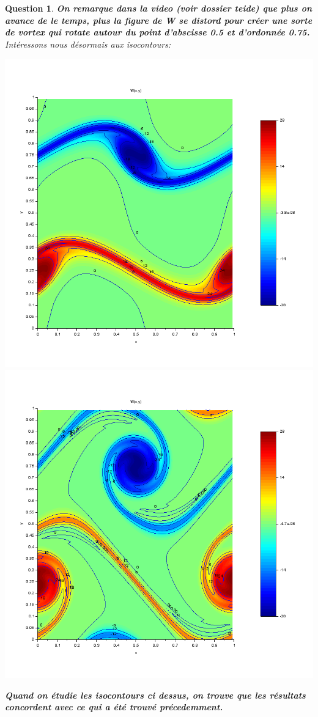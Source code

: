 \documentclass[a4paper,10pt]{article}
\newtheorem{question}{Question}
\begin{document}
\begin{question}
\textbf{On remarque dans la video (voir dossier teide) que plus on avance de le temps, plus la figure de W se distord pour créer une sorte de vortex qui rotate autour du point d'abscisse 0.5 et d'ordonnée 0.75.}
\vskip 1cm
Intéressons nous désormais aux isocontours:
\begin{center}
\includegraphics[scale=0.31]{iso80.png}
\label{fig1}
\includegraphics[scale=0.31]{iso120.png}
\label{fig1}
\end{center}
\vskip 0.5cm
\textbf{Quand on étudie les isocontours ci dessus, on trouve que les résultats concordent avec ce qui a été trouvé précedemment.}
\end{question}
\end{document}

